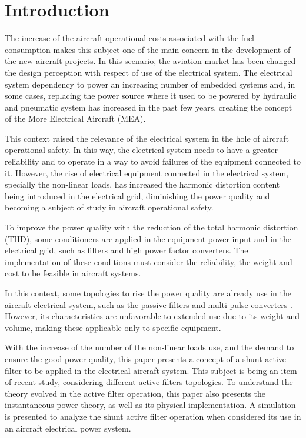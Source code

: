 \section{Introduction}

The increase of the aircraft operational costs associated with the fuel consumption makes this subject one of the main concern in the development of the new aircraft projects. In this scenario, the aviation market has been changed the design perception with respect of use of the electrical system. The electrical system dependency to power an increasing number of embedded systems and, in some cases, replacing the power source where it used to be powered by hydraulic and pneumatic system has increased in the past few years, creating the concept of the More Electrical Aircraft (MEA).

This context raised the relevance of the electrical system in the hole of aircraft operational safety. In this way, the electrical system needs to have a greater reliability and to operate in a way to avoid failures of the equipment connected to it. However, the rise of electrical equipment connected in the electrical system, specially the non-linear loads, has increased the harmonic distortion content being introduced in the electrical grid, diminishing the power quality and becoming a subject of study in aircraft operational safety.

To improve the power quality with the reduction of the total harmonic distortion (THD), some conditioners are applied in the equipment power input and in the electrical grid, such as filters and high power factor converters. The implementation of these conditions must consider the reliability, the weight and cost to be feasible in aircraft systems.

In this context, some topologies to rise the power quality are already use in the aircraft electrical system, such as the passive filters and multi-pulse converters \cite{}. However, its characteristics are unfavorable to extended use due to its weight and volume, making these applicable only to specific equipment.

With the increase of the number of the non-linear loads use, and the demand to ensure the good power quality, this paper presents a concept of a shunt active filter to be applied in the electrical aircraft system. This subject is being an item of recent study, considering different active filters topologies. To understand the theory evolved in the active filter operation, this paper also presents the instantaneous power theory, as well as its physical implementation. A simulation is presented to analyze the shunt active filter operation when considered its use in an aircraft electrical power system.